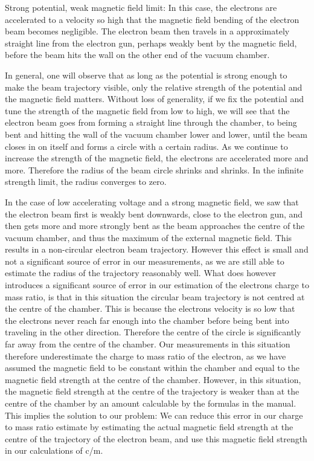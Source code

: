 \documentclass[a4paper,12pt]{article}
\begin{document}
Strong potential, weak magnetic field limit: In this case, the electrons are accelerated to a velocity so high that the magnetic field bending of the electron beam becomes negligible.
The electron beam then travels in a approximately straight line from the electron gun, perhaps weakly bent by the magnetic field, before the beam hits the wall on
the other end of the vacuum chamber.

In general, one will observe that as long as the potential is strong enough to make the beam trajectory visible, only the relative strength of the 
potential and the magnetic field matters. Without loss of generality, if we fix the potential and tune the strength of the magnetic field from low to high, 
we will see that the electron beam goes from forming a straight line through the chamber, to being bent and hitting the wall of the vacuum chamber lower 
and lower, until the beam closes in on itself and forms a circle with a certain radius. As we continue to increase the strength of the magnetic field, the 
electrons are accelerated more and more. Therefore the radius of the beam circle shrinks and shrinks. In the infinite strength limit, the radius 
converges to zero. 

In the case of low accelerating voltage and a strong magnetic field, we saw that the electron beam first is weakly bent downwards, close to the electron gun, 
and then gets more and more strongly bent as the beam approaches the centre of the vacuum chamber, and thus the maximum of the external magnetic field. This 
results in a non-circular electron beam trajectory. However this effect is small and not a significant source of error in our measurements, as we are still
able to estimate the radius of the trajectory reasonably well. What does however introduces a significant source of error in our estimation of the electrons 
charge to mass ratio, is that in this situation the circular beam trajectory is not centred at the centre of the chamber. This is because the electrons velocity 
is so low that the electrons never reach far enough into the chamber before being bent into traveling in the other direction. Therefore the centre of the 
circle is significantly far away from the centre of the chamber. Our measurements in this situation therefore underestimate the charge to mass ratio of the electron, 
as we have assumed the magnetic field to be constant within the chamber and equal to the magnetic field strength at the centre of the chamber. However, in this situation, 
the magnetic field strength at the centre of the trajectory is weaker than at the centre of the chamber by an amount calculable by the formulas in the manual. 
This implies the solution to our problem: We can reduce this error in our charge to mass ratio estimate by estimating the actual magnetic field strength at 
the centre of the trajectory of the electron beam, and use this magnetic field strength in our calculations of c/m.
\end{document}
